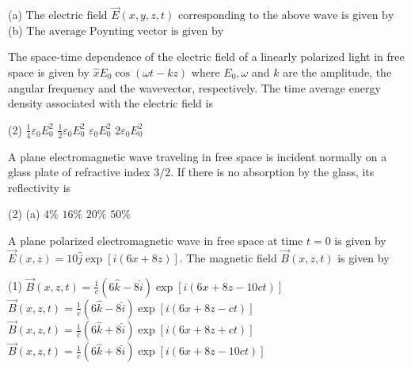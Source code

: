 \begin{enumerate}
\begin{minipage}{\textwidth}
	(a)$\text { The electric field } \vec{E}(x, y, z, t) \text { corresponding to the above wave is given by }$\\
	(b)$\text { The average Poynting vector is given by }$
\end{minipage}
\begin{minipage}{\textwidth}
	\item The space-time dependence of the electric field of a linearly polarized light in free space is given by $\hat{x} E_{0} \cos (\omega t-k z)$ where $E_{0}, \omega$ and $k$ are the amplitude, the angular frequency and the wavevector, respectively. The time average energy density associated with the electric field is
\end{minipage}
\begin{tasks}(2)
	\task[\textbf{A.}] $\frac{1}{4} \varepsilon_{0} E_{0}^{2}$
	\task[\textbf{B.}]$\frac{1}{2} \varepsilon_{0} E_{0}^{2}$
	\task[\textbf{C.}]$\varepsilon_{0} E_{0}^{2}$
	\task[\textbf{D.}]$2 \varepsilon_{0} E_{0}^{2}$
\end{tasks}
\begin{minipage}{\textwidth}
	\item A plane electromagnetic wave traveling in free space is incident normally on a glass plate of refractive index $3 / 2 .$ If there is no absorption by the glass, its reflectivity is
\end{minipage}
\begin{tasks}(2)
	\task[\textbf{A.}](a) $4 \%$
	\task[\textbf{B.}] $16 \%$
	\task[\textbf{C.}]$20 \%$
	\task[\textbf{D.}]$50 \%$
\end{tasks}
\begin{minipage}{\textwidth}
	\item A plane polarized electromagnetic wave in free space at time $t=0$ is given by $\vec{E}(x, z)=10 \hat{j} \exp [i(6 x+8 z)] .$ The magnetic field $\vec{B}(x, z, t)$ is given by
\end{minipage}
\begin{tasks}(1)
	\task[\textbf{A.}] $\vec{B}(x, z, t)=\frac{1}{c}(6 \hat{k}-8 \hat{i}) \exp [i(6 x+8 z-10 c t)]$ 
	\task[\textbf{C.}]$\vec{B}(x, z, t)=\frac{1}{c}(6 \hat{k}-8 \hat{i}) \exp [i(6 x+8 z-c t)]$
	\task[\textbf{D.}]$\vec{B}(x, z, t)=\frac{1}{c}(6 \hat{k}+8 \hat{i}) \exp [i(6 x+8 z+c t)]$
	\task[\textbf{B.}]$\vec{B}(x, z, t)=\frac{1}{c}(6 \hat{k}+8 \hat{i}) \exp [i(6 x+8 z-10 c t)]$
\end{tasks}
\begin{minipage}{\textwidth}

\end{minipage}
\end{enumerate}
